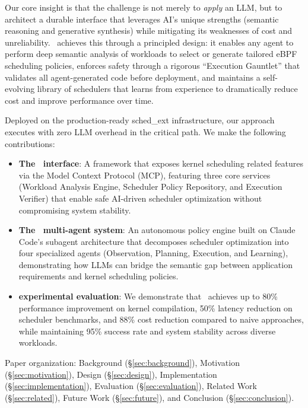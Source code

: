 Our core insight is that the challenge is not merely to \emph{apply} an LLM, but to architect a durable interface that leverages AI's unique strengths (semantic reasoning and generative synthesis) while mitigating its weaknesses of cost and unreliability. \sys\ achieves this through a principled design: it enables any agent to perform deep semantic analysis of workloads to select or generate tailored eBPF scheduling policies, enforces safety through a rigorous ``Execution Gauntlet'' that validates all agent-generated code before deployment, and maintains a self-evolving library of schedulers that learns from experience to dramatically reduce cost and improve performance over time.

Deployed on the production-ready sched\_ext infrastructure, our approach executes with zero LLM overhead in the critical path. We make the following contributions:
\begin{itemize}
    \item \textbf{The \sys\ interface}: A framework that exposes kernel scheduling related features via the Model Context Protocol (MCP), featuring three core services (Workload Analysis Engine, Scheduler Policy Repository, and Execution Verifier) that enable safe AI-driven scheduler optimization without compromising system stability.
    \item \textbf{The \agent\ multi-agent system}: An autonomous policy engine built on Claude Code's subagent architecture that decomposes scheduler optimization into four specialized agents (Observation, Planning, Execution, and Learning), demonstrating how LLMs can bridge the semantic gap between application requirements and kernel scheduling policies.
    \item \textbf{experimental evaluation}: We demonstrate that \agent\ achieves up to 80\% performance improvement on kernel compilation, 50\% latency reduction on scheduler benchmarks, and 88\% cost reduction compared to naive approaches, while maintaining 95\% success rate and system stability across diverse workloads.
\end{itemize}

Paper organization: Background (§\ref{sec:background}), Motivation (§\ref{sec:motivation}), Design (§\ref{sec:design}), Implementation (§\ref{sec:implementation}), Evaluation (§\ref{sec:evaluation}), Related Work (§\ref{sec:related}), Future Work (§\ref{sec:future}), and Conclusion (§\ref{sec:conclusion}).

